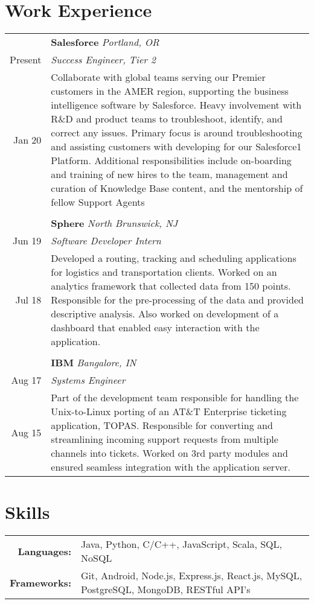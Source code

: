 \documentclass[article,10pt]{article}
\begin{document}
\section{Work Experience}
\begin{tabular}{r|p{16.75cm}}
 & \textbf{Salesforce} \sl{Portland, OR} \\ 
 {Present} & \emph{Success Engineer, Tier 2}\\
 {Jan \textquotesingle{}20} & \footnotesize{Collaborate with global teams serving our Premier customers in the AMER region, supporting the business intelligence software by Salesforce. 
Heavy involvement with R\&D and product teams to troubleshoot, identify, and correct any issues. Primary focus is around troubleshooting and assisting customers with developing for our Salesforce1 Platform. Additional responsibilities include on-boarding and training of new hires to the team, management and curation of Knowledge Base content, and the mentorship of fellow Support Agents}\\\multicolumn{2}{c}{}\\
 & \textbf{Sphere} \sl{North Brunswick, NJ} \\ 
 {Jun \textquotesingle{}19} & \emph{Software Developer Intern}\\
 {Jul \textquotesingle{}18} & \footnotesize{Developed a routing, tracking and scheduling applications for logistics and transportation clients. Worked on an analytics framework that collected data from 150 points. Responsible for the pre-processing of the data and provided descriptive analysis. Also worked on development of a dashboard that enabled easy interaction with the application.}\\\multicolumn{2}{c}{}\\
 & \textbf{IBM} \sl{Bangalore, IN} \\
 {Aug \textquotesingle{}17} & \emph{Systems Engineer}\\
 {Aug \textquotesingle{}15} & \footnotesize{Part of the development team responsible for handling the Unix-to-Linux porting of an AT\&T Enterprise ticketing application, TOPAS. Responsible for converting and streamlining incoming support requests from multiple channels into tickets. Worked on 3rd party modules and ensured seamless integration with the application server.}\\
\end{tabular}

\section{Skills}
\begin{tabular}{rl}
	\textbf{Languages:} & Java, Python, C/C++, JavaScript, Scala, SQL, NoSQL\\
	\textbf{Frameworks:} & Git, Android, Node.js, Express.js, React.js, MySQL, PostgreSQL, MongoDB, RESTful API’s \\
\end{tabular}
\end{document}
